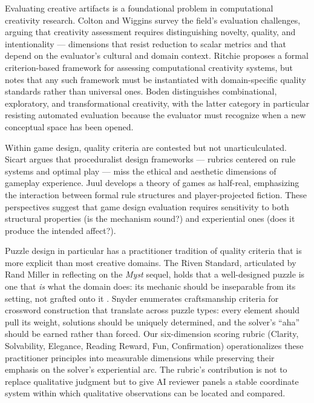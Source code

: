 Evaluating creative artifacts is a foundational problem in computational creativity research. Colton and Wiggins \cite{colton2012computational} survey the field's evaluation challenges, arguing that creativity assessment requires distinguishing novelty, quality, and intentionality --- dimensions that resist reduction to scalar metrics and that depend on the evaluator's cultural and domain context. Ritchie \cite{ritchie2007assessing} proposes a formal criterion-based framework for assessing computational creativity systems, but notes that any such framework must be instantiated with domain-specific quality standards rather than universal ones. Boden \cite{boden2004creative} distinguishes combinational, exploratory, and transformational creativity, with the latter category in particular resisting automated evaluation because the evaluator must recognize when a new conceptual space has been opened.

Within game design, quality criteria are contested but not unarticulculated. Sicart \cite{sicart2011against} argues that proceduralist design frameworks --- rubrics centered on rule systems and optimal play --- miss the ethical and aesthetic dimensions of gameplay experience. Juul \cite{juul2005half} develops a theory of games as half-real, emphasizing the interaction between formal rule structures and player-projected fiction. These perspectives suggest that game design evaluation requires sensitivity to both structural properties (is the mechanism sound?) and experiential ones (does it produce the intended affect?).

Puzzle design in particular has a practitioner tradition of quality criteria that is more explicit than most creative domains. The Riven Standard, articulated by Rand Miller in reflecting on the \emph{Myst} sequel, holds that a well-designed puzzle is one that \emph{is} what the domain does: its mechanic should be inseparable from its setting, not grafted onto it \cite{miller2016riven}. Snyder \cite{snyder2019craftsmanship} enumerates craftsmanship criteria for crossword construction that translate across puzzle types: every element should pull its weight, solutions should be uniquely determined, and the solver's ``aha'' should be earned rather than forced. Our six-dimension scoring rubric (Clarity, Solvability, Elegance, Reading Reward, Fun, Confirmation) operationalizes these practitioner principles into measurable dimensions while preserving their emphasis on the solver's experiential arc. The rubric's contribution is not to replace qualitative judgment but to give AI reviewer panels a stable coordinate system within which qualitative observations can be located and compared.

